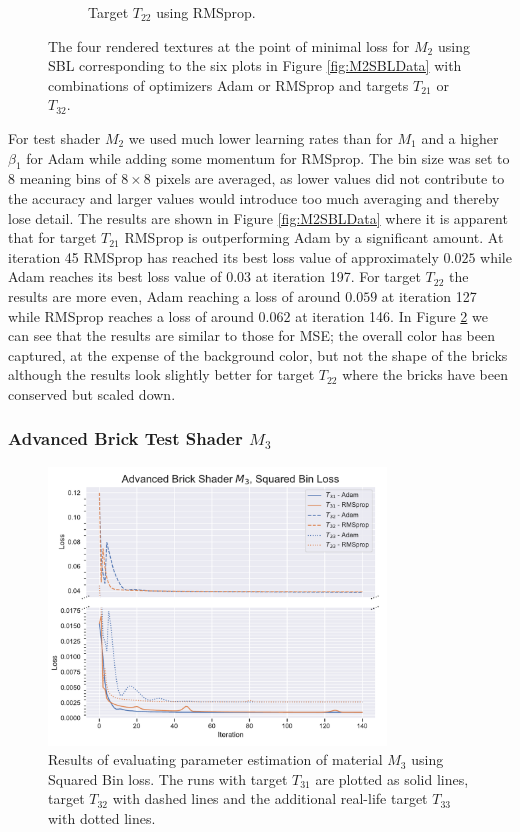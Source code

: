 \begin{figure}
\begin{subfigure}[t]{.25\textwidth}
    \caption{Target $T_{22}$ using RMSprop.}
    \label{fig:M2SBLFinalRendersRandomRMSprop}
\end{subfigure}
\caption{The four rendered textures at the point of minimal loss for $M_2$ using SBL corresponding to the six plots in Figure \ref{fig:M2SBLData} with combinations of optimizers Adam or RMSprop and targets $T_{21}$ or $T_{32}$.}
\label{fig:M2SBLFinalRenders}
\end{figure}

For test shader $M_2$ we used much lower learning rates than for $M_1$ and a higher $\beta_1$ for Adam while adding some momentum for RMSprop. The bin size was set to $8$ meaning bins of $8\times 8$ pixels are averaged, as lower values did not contribute to the accuracy and larger values would introduce too much averaging and thereby lose detail. The results are shown in Figure \ref{fig:M2SBLData} where it is apparent that for target $T_{21}$ RMSprop is outperforming Adam by a significant amount. At iteration 45 RMSprop has reached its best loss value of approximately $0.025$ while Adam reaches its best loss value of $0.03$ at iteration 197. For target $T_{22}$ the results are more even, Adam reaching a loss of around $0.059$ at iteration 127 while RMSprop reaches a loss of around $0.062$ at iteration 146. In Figure \ref{fig:M2SBLFinalRenders} we can see that the results are similar to those for MSE; the overall color has been captured, at the expense of the background color, but not the shape of the bricks although the results look slightly better for target $T_{22}$ where the bricks have been conserved but scaled down.

\subsubsection{Advanced Brick Test Shader $M_3$}

\begin{figure}
    \centering
    \includegraphics[width=0.8\textwidth]{img/evaluation/M3/ABS_SBL.pdf}
    \caption{Results of evaluating parameter estimation of material $M_3$ using Squared Bin loss. The runs with target $T_{31}$ are plotted as solid lines, target $T_{32}$ with dashed lines and the additional real-life target $T_{33}$ with dotted lines.}
    \label{fig:M3SBLData}
\end{figure}

